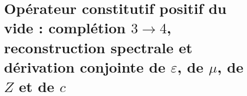 \chapter{Opérateur constitutif positif du vide : complétion \(3\to4\), reconstruction spectrale et dérivation conjointe de \(\varepsilon\), de \(\mu\), de \(Z\) et de \(c\)}
\label{chap:p3-final:39:vacio_constitutivo}


